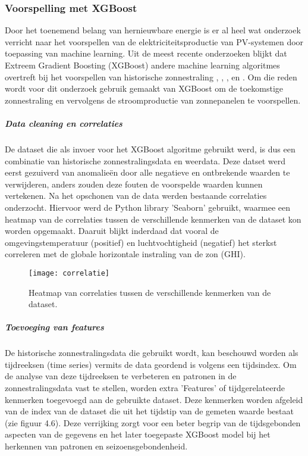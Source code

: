 \subsubsection{Voorspelling met XGBoost}

Door het toenemend belang van hernieuwbare energie is er al heel wat onderzoek verricht naar het voorspellen van de elektriciteitsproductie van PV-systemen door toepassing van machine learning. Uit de meest recente onderzoeken blijkt dat Extreem Gradient Boosting (XGBoost) andere machine learning algoritmes overtreft bij het voorspellen van historische zonnestraling \autocite{Khasawneh2024}, \autocite{Tercha2024},  \autocite{Ledmaoui2023}, \autocite{Wang2022} en \autocite{BarreraAnimas2022}. Om die reden wordt voor dit onderzoek gebruik gemaakt van XGBoost om de toekomstige zonnestraling en vervolgens de stroomproductie van zonnepanelen te voorspellen. 

\subparagraph{Data cleaning en correlaties}
De dataset die als invoer voor het XGBoost algoritme gebruikt werd, is dus een combinatie van historische zonnestralingsdata en weerdata. Deze datset werd eerst gezuiverd van anomalieën door alle negatieve en ontbrekende waarden te verwijderen, anders zouden deze fouten de voorspelde waarden kunnen vertekenen. Na het opschonen van de data werden bestaande correlaties onderzocht. Hiervoor werd de Python library 'Seaborn' gebruikt, waarmee een heatmap van de correlaties tussen de verschillende kenmerken van de dataset kon worden opgemaakt. Daaruit blijkt inderdaad dat vooral de omgevingstemperatuur (positief) en luchtvochtigheid (negatief) het sterkst correleren met de globale horizontale instraling van de zon (GHI). 

\begin{figure}[h!]
    \centering\texttt{[image: correlatie]}
    \caption{\label{fig:correlatie}Heatmap van correlaties tussen de verschillende kenmerken van de dataset.}
\end{figure} 

\newpage
\subparagraph{Toevoeging van features}
De historische zonnestralingsdata die gebruikt wordt, kan beschouwd worden als tijdreeksen (time series) vermits de data geordend is volgens een tijdsindex. Om de analyse van deze tijdreeksen te verbeteren en patronen in de zonnestralingsdata vast te stellen, worden extra 'Features' of tijdgerelateerde kenmerken  toegevoegd aan de gebruikte dataset. Deze kenmerken worden afgeleid van de index van de dataset die uit het tijdstip van de gemeten waarde bestaat (zie figuur 4.6). Deze verrijking zorgt voor een beter begrip van de tijdsgebonden aspecten van de gegevens en het later toegepaste XGBoost model bij het herkennen van patronen en seizoensgebondenheid.  

